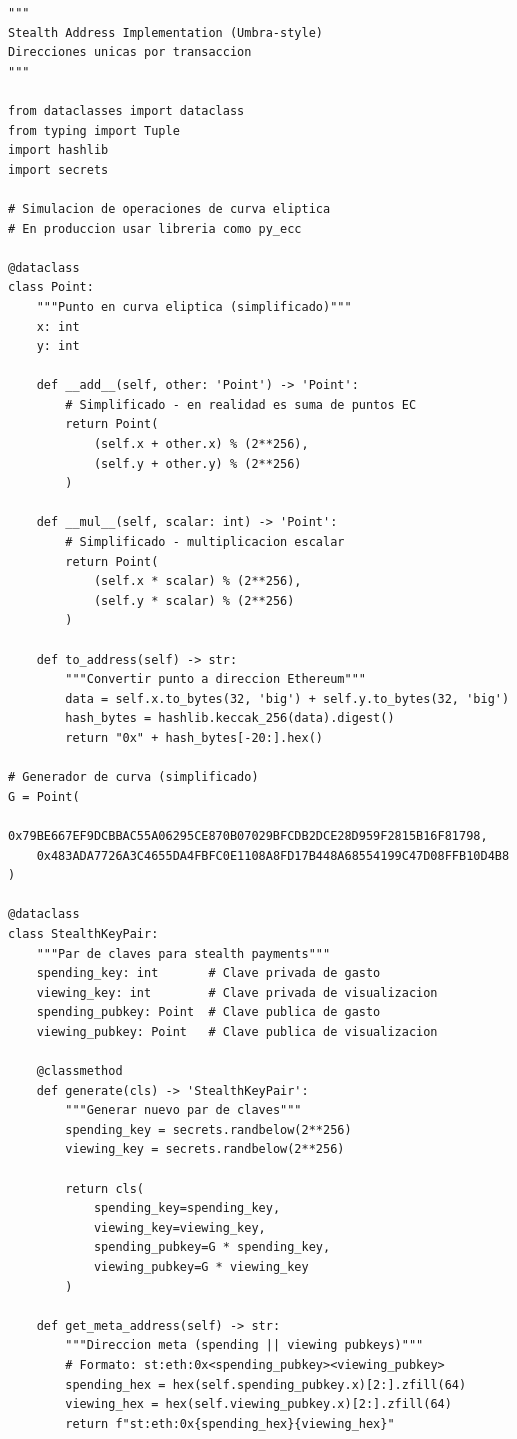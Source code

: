 \documentclass[11pt,a4paper,twoside]{book}
\theoremstyle{definition}
\theoremstyle{remark}
\begin{document}
\begin{lstlisting}[style=python, caption={Implementación simplificada de Stealth Addresses}]
"""
Stealth Address Implementation (Umbra-style)
Direcciones unicas por transaccion
"""

from dataclasses import dataclass
from typing import Tuple
import hashlib
import secrets

# Simulacion de operaciones de curva eliptica
# En produccion usar libreria como py_ecc

@dataclass
class Point:
    """Punto en curva eliptica (simplificado)"""
    x: int
    y: int
    
    def __add__(self, other: 'Point') -> 'Point':
        # Simplificado - en realidad es suma de puntos EC
        return Point(
            (self.x + other.x) % (2**256),
            (self.y + other.y) % (2**256)
        )
    
    def __mul__(self, scalar: int) -> 'Point':
        # Simplificado - multiplicacion escalar
        return Point(
            (self.x * scalar) % (2**256),
            (self.y * scalar) % (2**256)
        )
    
    def to_address(self) -> str:
        """Convertir punto a direccion Ethereum"""
        data = self.x.to_bytes(32, 'big') + self.y.to_bytes(32, 'big')
        hash_bytes = hashlib.keccak_256(data).digest()
        return "0x" + hash_bytes[-20:].hex()

# Generador de curva (simplificado)
G = Point(
    0x79BE667EF9DCBBAC55A06295CE870B07029BFCDB2DCE28D959F2815B16F81798,
    0x483ADA7726A3C4655DA4FBFC0E1108A8FD17B448A68554199C47D08FFB10D4B8
)

@dataclass
class StealthKeyPair:
    """Par de claves para stealth payments"""
    spending_key: int       # Clave privada de gasto
    viewing_key: int        # Clave privada de visualizacion
    spending_pubkey: Point  # Clave publica de gasto
    viewing_pubkey: Point   # Clave publica de visualizacion
    
    @classmethod
    def generate(cls) -> 'StealthKeyPair':
        """Generar nuevo par de claves"""
        spending_key = secrets.randbelow(2**256)
        viewing_key = secrets.randbelow(2**256)
        
        return cls(
            spending_key=spending_key,
            viewing_key=viewing_key,
            spending_pubkey=G * spending_key,
            viewing_pubkey=G * viewing_key
        )
    
    def get_meta_address(self) -> str:
        """Direccion meta (spending || viewing pubkeys)"""
        # Formato: st:eth:0x<spending_pubkey><viewing_pubkey>
        spending_hex = hex(self.spending_pubkey.x)[2:].zfill(64)
        viewing_hex = hex(self.viewing_pubkey.x)[2:].zfill(64)
        return f"st:eth:0x{spending_hex}{viewing_hex}"



\end{lstlisting}
\end{document}
